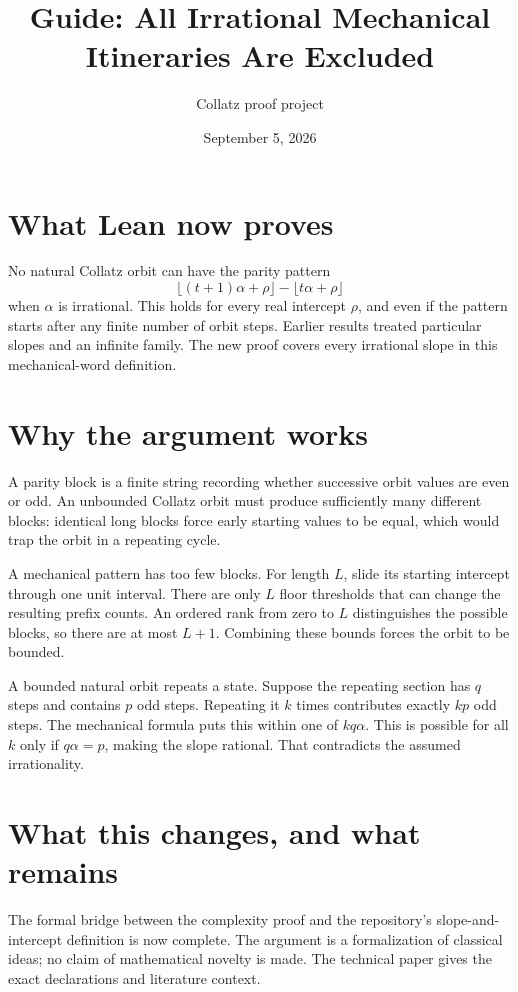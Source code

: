 \documentclass[10pt]{article}
\title{Guide: All Irrational Mechanical Itineraries Are Excluded}
\author{Collatz proof project}
\date{September 5, 2026}
\begin{document}
\maketitle
\section*{What Lean now proves}
No natural Collatz orbit can have the parity pattern
\[
\lfloor(t+1)\alpha+\rho\rfloor-\lfloor t\alpha+\rho\rfloor
\]
when $\alpha$ is irrational. This holds for every real intercept $\rho$,
and even if the pattern starts after any finite number of orbit steps.
Earlier results treated particular slopes and an infinite family. The new
proof covers every irrational slope in this mechanical-word definition.

\section*{Why the argument works}
A parity block is a finite string recording whether successive orbit values
are even or odd. An unbounded Collatz orbit must produce sufficiently many
different blocks: identical long blocks force early starting values to be
equal, which would trap the orbit in a repeating cycle.

A mechanical pattern has too few blocks. For length $L$, slide its starting
intercept through one unit interval. There are only $L$ floor thresholds
that can change the resulting prefix counts. An ordered rank from zero to
$L$ distinguishes the possible blocks, so there are at most $L+1$.
Combining these bounds forces the orbit to be bounded.

A bounded natural orbit repeats a state. Suppose the repeating section has
$q$ steps and contains $p$ odd steps. Repeating it $k$ times contributes
exactly $kp$ odd steps. The mechanical formula puts this within one of
$kq\alpha$. This is possible for all $k$ only if $q\alpha=p$, making the
slope rational. That contradicts the assumed irrationality.

\section*{What this changes, and what remains}
The formal bridge between the complexity proof and the repository's
slope-and-intercept definition is now complete. The argument is a
formalization of classical ideas; no claim of mathematical novelty is made.
The technical paper gives the exact declarations and literature context.
\end{document}

